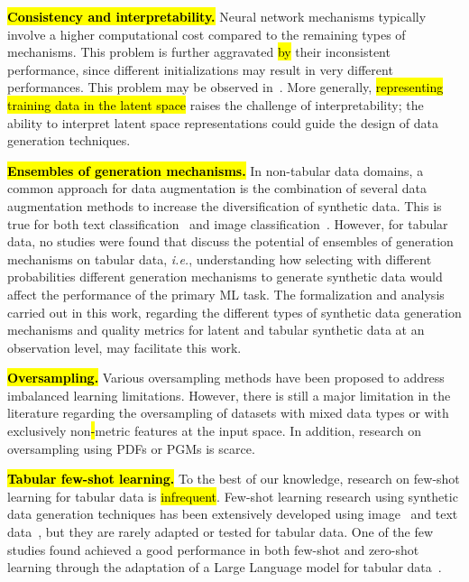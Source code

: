 \hl{\textbf{Consistency and interpretability. }}Neural network mechanisms typically
involve a higher computational cost compared to the remaining types of
mechanisms. This problem is further aggravated \hl{by} their inconsistent
performance, since different initializations may result in very different
performances. This problem may be observed in~\cite{douzas2018effective}. More
generally, \hl{representing training data in the latent space} raises the
challenge of interpretability; the ability to interpret latent space
representations could guide the design of data generation techniques. 

\hl{\textbf{Ensembles of generation mechanisms.} }In non-tabular data domains,
a common approach for data augmentation is the combination of several data
augmentation methods to increase the diversification of synthetic data. This
is true for both text classification~\cite{bayer2021survey} and image
classification~\cite{grill2020bootstrap}. However, for tabular data, no
studies were found that discuss the potential of ensembles of generation
mechanisms on tabular data, \textit{i.e.}, understanding how selecting with
different probabilities different generation mechanisms to generate synthetic
data would affect the performance of the primary ML task. The formalization
and analysis carried out in this work, regarding the different types of
synthetic data generation mechanisms and quality metrics for latent and
tabular synthetic data at an observation level, may facilitate this work.


\hl{\textbf{Oversampling. }}Various oversampling methods have been proposed to
address imbalanced learning limitations. However, there is still a major
limitation in the literature regarding the oversampling of datasets with mixed
data types or with exclusively non\hl{-}metric features at the input space. In
addition,\hl{ }research on oversampling using PDFs or PGMs is scarce.

\hl{\textbf{Tabular few-shot learning.} }To the best of our knowledge,
research on few-shot learning for tabular data is \hl{infrequent}. Few-shot
learning research using synthetic data generation techniques has been
extensively developed using image~\cite{cubuk2019autoaugment, zhao2019data}
and text data~\cite{zhou2021flipda}, but they are rarely adapted or tested for
tabular data. One of the few studies found achieved a good performance in both
few-shot and zero-shot learning through the adaptation of a Large Language
model for tabular data~\cite{hegselmann2022tabllm}. 

